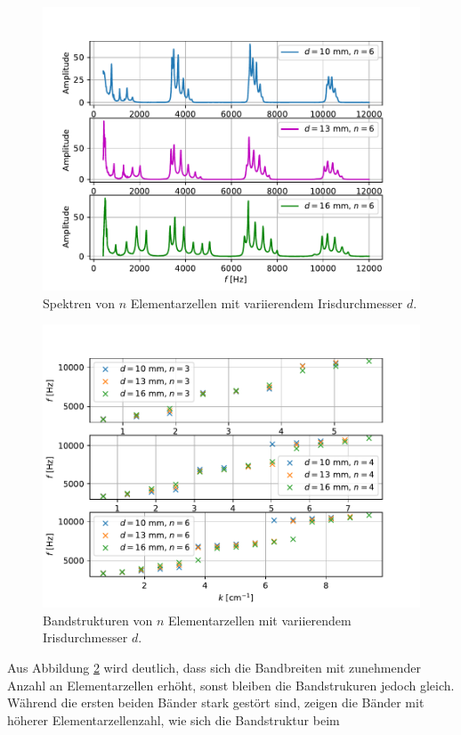\begin{figure}
  \centering
  \includegraphics[scale=0.5]{Messwerte/plot14.pdf}
  \caption{Spektren von $n$ Elementarzellen mit variierendem Irisdurchmesser $d$.}
  \label{fig:plot14}
\end{figure}
\begin{figure}
  \centering
  \includegraphics[scale=0.5]{Messwerte/plot15.pdf}
  \caption{Bandstrukturen von $n$ Elementarzellen mit variierendem Irisdurchmesser $d$.}
  \label{fig:plot15}
\end{figure}
Aus Abbildung \ref{fig:plot15} wird deutlich, dass sich die Bandbreiten mit zunehmender Anzahl an Elementarzellen erhöht, sonst bleiben die Bandstrukuren jedoch gleich.
Während die ersten beiden Bänder stark gestört sind, zeigen die Bänder mit höherer Elementarzellenzahl, wie sich die Bandstruktur beim
